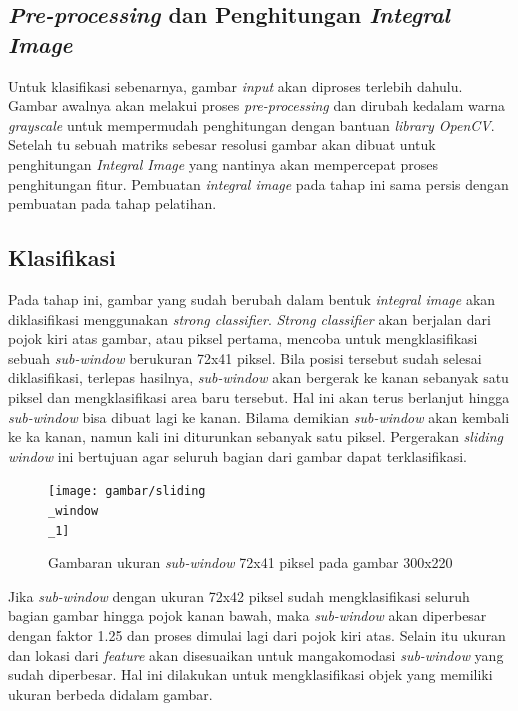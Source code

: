 \subsection{\textit{Pre-processing} dan Penghitungan \emph{Integral Image}}

Untuk klasifikasi sebenarnya, gambar \emph{input} akan diproses terlebih dahulu. 
Gambar awalnya akan melakui proses \textit{pre-processing} dan dirubah kedalam warna 
\emph{grayscale} %
untuk mempermudah penghitungan dengan bantuan \emph{library OpenCV}. 
Setelah tu sebuah matriks sebesar resolusi gambar akan dibuat untuk 
penghitungan \emph{Integral Image} yang nantinya akan mempercepat proses 
penghitungan fitur. Pembuatan \emph{integral image} pada tahap ini sama persis 
dengan pembuatan pada tahap pelatihan.

\subsection{Klasifikasi}

Pada tahap ini, gambar yang sudah berubah dalam bentuk 
\emph{integral image} akan diklasifikasi menggunakan 
\emph{strong classifier}. \emph{Strong classifier} akan berjalan dari 
pojok kiri atas gambar, atau piksel pertama, mencoba untuk mengklasifikasi 
sebuah \emph{sub-window} berukuran 72x41 piksel. Bila posisi tersebut sudah 
selesai diklasifikasi, terlepas hasilnya, \emph{sub-window} akan 
bergerak ke kanan sebanyak satu piksel dan mengklasifikasi area baru tersebut. 
Hal ini akan terus berlanjut hingga \emph{sub-window} bisa dibuat lagi ke kanan. 
Bilama demikian \emph{sub-window} akan kembali ke ka kanan, namun kali ini 
diturunkan sebanyak satu piksel. Pergerakan \emph{sliding window} ini 
bertujuan agar seluruh bagian dari gambar dapat terklasifikasi.

\begin{figure}[H]
  \centering{}
	\texttt{[image: gambar/sliding\\\_window\\\_1]}
  \caption{Gambaran ukuran \emph{sub-window} 72x41 piksel pada gambar 300x220}
\end{figure}

Jika \emph{sub-window} dengan ukuran 72x42 piksel sudah mengklasifikasi 
seluruh bagian gambar hingga pojok kanan bawah, maka \emph{sub-window} 
akan diperbesar dengan faktor 1.25 dan proses dimulai lagi dari pojok kiri atas. 
Selain itu ukuran dan lokasi dari \emph{feature} akan disesuaikan untuk mangakomodasi 
\emph{sub-window} yang sudah diperbesar. Hal ini dilakukan untuk mengklasifikasi 
objek yang memiliki ukuran berbeda didalam gambar.

